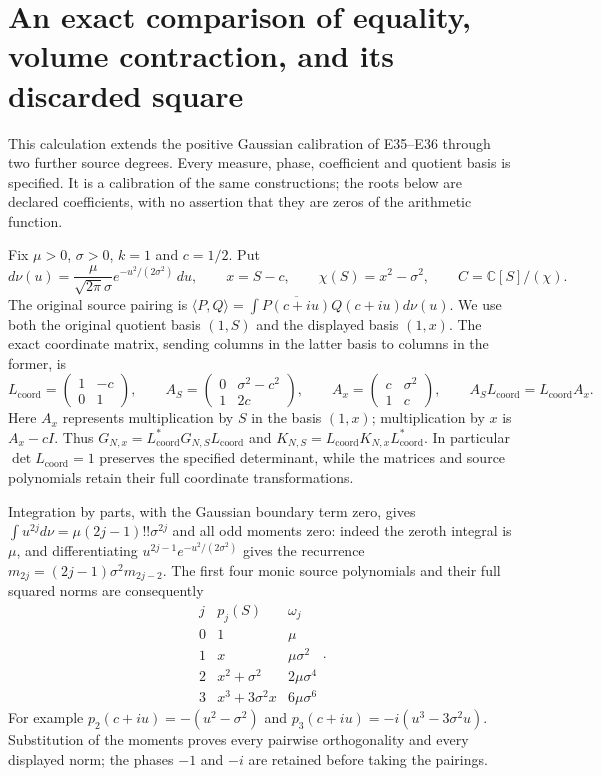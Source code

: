\section{An exact comparison of equality, volume contraction, and its discarded square}

This calculation extends the positive Gaussian calibration of E35--E36
through two further source degrees. Every measure, phase, coefficient and
quotient basis is specified. It is a calibration of the same constructions;
the roots below are declared coefficients, with no assertion that they are
zeros of the arithmetic function.

Fix $\mu>0$, $\sigma>0$, $k=1$ and $c=1/2$. Put
\[
 d\nu(u)=\frac{\mu}{\sqrt{2\pi}\sigma}
             e^{-u^2/(2\sigma^2)}\,du,\qquad
 x=S-c,\qquad \chi(S)=x^2-\sigma^2,
 \qquad C=\mathbb C[S]/(\chi).
 \tag{TC1}
\]
The original source pairing is
$\langle P,Q\rangle=\int\overline{P(c+iu)}Q(c+iu)d\nu(u)$.
We use both the original quotient basis $(1,S)$ and the displayed basis
$(1,x)$. The exact coordinate matrix, sending columns in the latter basis
to columns in the former, is
\[
 L_{\mathrm{coord}}=\begin{pmatrix}1&-c\\0&1\end{pmatrix},\qquad
 A_S=\begin{pmatrix}0&\sigma^2-c^2\\1&2c\end{pmatrix},\qquad
 A_x=\begin{pmatrix}c&\sigma^2\\1&c\end{pmatrix},\qquad
 A_SL_{\mathrm{coord}}=L_{\mathrm{coord}}A_x.
 \tag{TC2}
\]
Here $A_x$ represents multiplication by $S$ in the basis $(1,x)$;
multiplication by $x$ is $A_x-cI$.
Thus $G_{N,x}=L_{\mathrm{coord}}^*G_{N,S}L_{\mathrm{coord}}$ and
$K_{N,S}=L_{\mathrm{coord}}K_{N,x}L_{\mathrm{coord}}^*$.
In particular $\det L_{\mathrm{coord}}=1$ preserves the
specified determinant, while the matrices and source polynomials retain
their full coordinate transformations.

Integration by parts, with the Gaussian boundary term zero, gives
$\int u^{2j}d\nu=\mu(2j-1)!!\sigma^{2j}$ and all odd moments zero:
indeed the zeroth integral is $\mu$, and differentiating
$u^{2j-1}e^{-u^2/(2\sigma^2)}$ gives the recurrence
$m_{2j}=(2j-1)\sigma^2m_{2j-2}$. The first four monic source
polynomials and their full squared norms are consequently
\[
 \begin{array}{c|c|c}
 j&p_j(S)&\omega_j\\\hline
 0&1&\mu\\
 1&x&\mu\sigma^2\\
 2&x^2+\sigma^2&2\mu\sigma^4\\
 3&x^3+3\sigma^2x&6\mu\sigma^6
 \end{array}.
 \tag{TC3}
\]
For example $p_2(c+iu)=-(u^2-\sigma^2)$ and
$p_3(c+iu)=-i(u^3-3\sigma^2u)$. Substitution of the moments
proves every pairwise orthogonality and every displayed norm; the phases
$-1$ and $-i$ are retained before taking the pairings.

